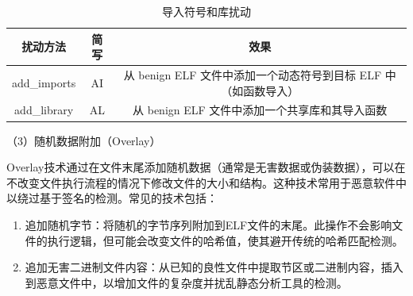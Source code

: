 
\begin{table}[htbp]
	\centering
	\caption{导入符号和库扰动}\label{tab:4.2}
	\begin{tabular*}{\textwidth}{@{\extracolsep{\fill}}ccc}
		\toprule
		扰动方法 & 简写 & 效果 \\
		\midrule
		add\_imports & AI & 从 benign ELF 文件中添加一个动态符号到目标 ELF 中（如函数导入） \\
		add\_library & AL & 从 benign ELF 文件中添加一个共享库和其导入函数 \\
		\bottomrule
	\end{tabular*}
\end{table}



（3）随机数据附加（Overlay）


Overlay技术通过在文件末尾添加随机数据（通常是无害数据或伪装数据），可以在不改变文件执行流程的情况下修改文件的大小和结构。这种技术常用于恶意软件中以绕过基于签名的检测。常见的技术包括：

\begin{enumerate}

\item 追加随机字节：将随机的字节序列附加到ELF文件的末尾。此操作不会影响文件的执行逻辑，但可能会改变文件的哈希值，使其避开传统的哈希匹配检测。


\item 追加无害二进制文件内容：从已知的良性文件中提取节区或二进制内容，插入到恶意文件中，以增加文件的复杂度并扰乱静态分析工具的检测。
\end{enumerate}

